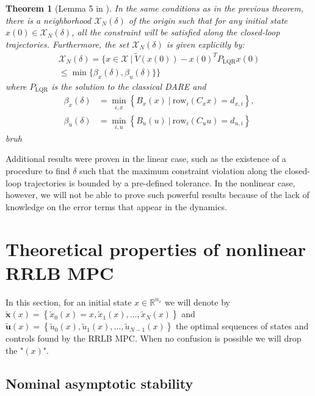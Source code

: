 \documentclass[conference]{IEEEtran}
\newtheorem{theorem}{Theorem}[section]
\theoremstyle{definition}
\theoremstyle{remark}
\def\cal#1{\mathcal{#1}}
\def\rm#1{\mathrm{#1}}
\def\bf#1{\mathbf{#1}}
\newcommand{\R}{\mathbb{R}}
\begin{document}
\begin{theorem}[Lemma 5 in \cite{RRLB-linear-MPC}]
	\label{constraint-satisfaction-guarantee-linear-case}
	In the same conditions as in the previous theorem, there is a neighborhood $\cal{X}_N(\delta)$ of the origin such that for any initial state $x(0)\in\cal{X}_N(\delta)$, all the constraint will be satisfied along the closed-loop trajectories.
	Furthermore, the set $\cal{X}_N(\delta)$ is given explicitly by:
	\begin{multline}
		\cal{X}_N(\delta)=\big\{x\in\cal{X}~|~\tilde{V}(x(0))-x(0)^TP_{\rm{LQR}}x(0)\\\leq\min\{\beta_x(\delta),\beta_u(\delta)\}\big\}
	\end{multline}
	where $P_{\rm{LQR}}$ is the solution to the classical DARE and
	\begin{align}
		\beta_x(\delta)&=\underset{i,x}{\min}\left\{ B_x(x)~|~\rm{row}_i(C_xx)=d_{x,i} \right\},\\
		\beta_u(\delta)&=\underset{i,u}{\min}\left\{ B_u(u)~|~\rm{row}_i(C_uu)=d_{u,i} \right\}
	\end{align}
	bruh
\end{theorem}
Additional results were proven in the linear case, such as the existence of a procedure to find $\delta$ such that the maximum constraint violation along the closed-loop trajectories is bounded by a pre-defined tolerance.
In the nonlinear case, however, we will not be able to prove such powerful results because of the lack of knowledge on the error terms that appear in the dynamics.

\section{Theoretical properties of nonlinear RRLB MPC}
\label{sec:RRLB-theoretical-properties}

In this section, for an initial state $x\in\R^{n_x}$ we will denote by $\tilde{\bf{x}}(x)=\left\{ \tilde{x}_0(x)=x,\tilde{x}_1(x),\ldots,\tilde{x}_N(x) \right\}$ and $\tilde{\bf{u}}(x)=\left\{ \tilde{u}_0(x),\tilde{u}_1(x),\ldots,\tilde{u}_{N-1}(x) \right\}$ the optimal sequences of states and controls found by the RRLB MPC.
When no confusion is possible we will drop the "$(x)$".

\subsection{Nominal asymptotic stability}\label{sec:RRLB-nominal-stability}
\end{document}

